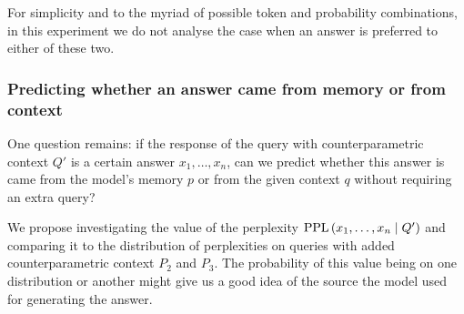 For simplicity and to the myriad of possible token and probability combinations, in this experiment we do not analyse the case when an answer is preferred to either of these two.

\subsubsection{Predicting whether an answer came from memory or from context}

One question remains: if the response of the query with counterparametric context $Q'$ is a certain answer $x_1, \dots, x_n$, can we predict whether this answer is came from the model's memory $p$ or from the given context $q$ without requiring an extra query?

We propose investigating the value of the perplexity $\text{PPL} \left( x_1, \dots, x_n \mid Q' \right)$ and comparing it to the distribution of perplexities on queries with added counterparametric context $P_2$ and $P_3$.
The probability of this value being on one distribution or another might give us a good idea of the source the model used for generating the answer.


